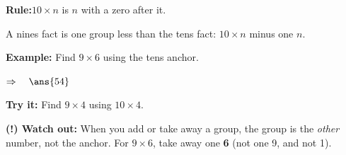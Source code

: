 \documentclass[12pt]{article}
\begin{document}
\begin{formulabox}
\textbf{Rule:}\quad $10 \times n$ is $n$ with a zero after it.\par
A nines fact is one group less than the tens fact: $10 \times n$ minus one $n$.
\end{formulabox}

\begin{examplebox}
\textbf{Example:} Find $9 \times 6$ using the tens anchor.

$\Rightarrow\quad\ans{54}$
\end{examplebox}

\begin{tryitbox}
\textbf{Try it:} Find $9 \times 4$ using $10 \times 4$.\\[2pt]
\end{tryitbox}

\begin{watchoutbox}
\textbf{(!) Watch out:} When you add or take away a group, the group is the \emph{other} number, not the anchor. For $9 \times 6$, take away one \textbf{6} (not one 9, and not 1).
\end{watchoutbox}
\end{document}
